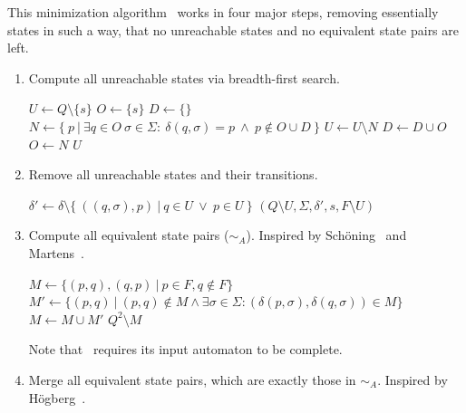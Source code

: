 This minimization algorithm \MinAlg\ works in four major steps, removing essentially states in such a way, that no unreachable states and no equivalent state pairs are left.
\begin{enumerate}
	\item Compute all unreachable states via breadth-first search.
	
	\vspace{0.2cm}
	\begin{algorithmic}[1]
			\State $U \gets Q \setminus \{s\}$	
			\State $O \gets \{s\}$				
			\State $D \gets \{\}$				
				\State $N \gets \{\ p\ | \ \exists q \in O\ \sigma \in \Sigma \colon\ \delta(q, \sigma) = p\ \land\ p \notin O \cup D\ \}$
				\State $U \gets U \setminus N$
				\State $D \gets D \cup O$
				\State $O \gets N$
			\EndWhile
			\State \Return $U$
		\EndFunction
	\end{algorithmic}

	\item Remove all unreachable states and their transitions.
	
	\vspace{0.2cm}
	\begin{algorithmic}[1]
            \State $\delta' \gets \delta \setminus \{\ ((q,\sigma),p)\ |\ q\in U\ \lor\ p\in U\ \}$
			\State \Return $(Q \setminus U, \Sigma, \delta', s, F \setminus U)$
		\EndFunction
	\end{algorithmic}

	\item Compute all equivalent state pairs ($\sim_A$). Inspired by Schöning~\cite[p. 46]{Sch01} and Martens~\cite[p. 17]{MS18}.
	
	\vspace{0.2cm}
	\begin{algorithmic}[1]
		 \label{ch:1:minmark}
		\State $M \gets \{ (p,q), (q,p)\ |\ p \in F, q \notin F \}$
		\Do
			\State $M' \gets \{ (p,q)\ |\ (p,q) \notin M \land \exists \sigma \in \Sigma \colon (\delta(p,\sigma), \delta(q,\sigma)) \in M \}$
			\State $M \gets M \cup M'$
		\State \Return $Q^2 \setminus M$
		\EndFunction
	\end{algorithmic}
	Note that \CompDist\ requires its input automaton to be complete. 

	\item Merge all equivalent state pairs, which are exactly those in $\sim_A$. Inspired by Högberg~\cite[p. 10]{HL20}.
	

\end{enumerate}
